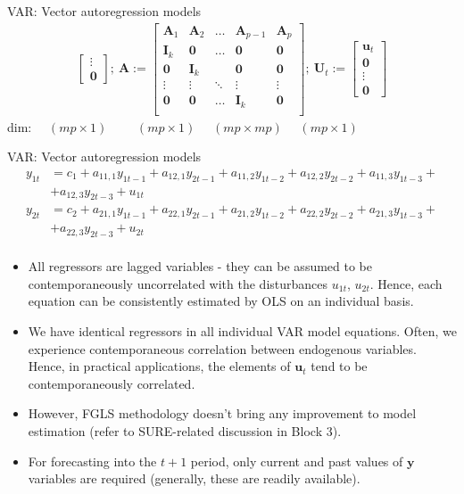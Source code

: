 \documentclass[usenames,dvipsnames]{beamer}
\begin{document}
\begin{frame}{VAR: Vector autoregression models}
\begin{align*}
\begin{bmatrix}
   \vdots \\
   \bm{0}
\end{bmatrix}
\!; \bm{~A} :=
\begin{bmatrix}
   \bm{A}_1 & \bm{A}_2 & \dots & \bm{A}_{p-1} & \bm{A}_p \\
   \bm{I}_k & \bm{0} & \dots & \bm{0} & \bm{0} \\
   \bm{0} & \bm{I}_k &   & \bm{0} & \bm{0} \\
   \vdots & \vdots & \ddots & \vdots & \vdots \\
   \bm{0} & \bm{0} & \dots & \bm{I}_k & \bm{0} \\
\end{bmatrix} \!; 
\bm{~U}_t := 
\begin{bmatrix}
   \bm{u}_t \\
   \bm{0} \\
   \vdots \\
   \bm{0}
\end{bmatrix}
\end{align*}
dim: ~~$(mp \times 1)$ \quad ~~~~$(mp \times 1)$ \qquad \qquad \qquad  ~~$(mp \times mp)$ \qquad  \qquad ~~$(mp \times 1)$
\end{frame}
\begin{frame}{VAR: Vector autoregression models}
\small
\vspace*{-5mm}
{\footnotesize
\begin{align*}
y_{1t} & = c_1 +  a_{11,1} y_{1t-1} + a_{12,1} y_{2t-1} + a_{11,2} y_{1t-2} + a_{12,2} y_{2t-2} + a_{11,3}  y_{1t-3} +\\
& + a_{12,3} y_{2t-3} + u_{1t}\\
y_{2t} & = c_2 +  a_{21,1} y_{1t-1} + a_{22,1} y_{2t-1} + a_{21,2} y_{1t-2} + a_{22,2} y_{2t-2} + a_{21,3}  y_{1t-3} +\\
& + a_{22,3} y_{2t-3} + u_{2t}\\
\end{align*}}
\vspace*{-9mm}
\begin{itemize}
\item All regressors are lagged variables - they can be assumed to be contemporaneously uncorrelated with the disturbances $u_{1t}$, $u_{2t}$. Hence, each equation can be consistently estimated by OLS on an individual basis.
\item We have identical regressors in all individual VAR model equations. Often, we experience contemporaneous correlation between endogenous variables. Hence, in practical applications, the elements of $\bm{u}_t$ tend to be contemporaneously correlated. 
\item However, FGLS methodology doesn't bring any improvement to model estimation (refer to SURE-related discussion in Block 3).
\item For forecasting into the $t+1$ period, only current and past values of $\bm{y}$ variables are required (generally, these are readily available).
\end{itemize}
\end{frame}
\end{document}
